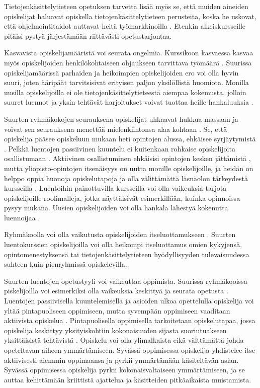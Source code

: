 \documentclass[finnish]{tktltiki2}
\theoremstyle{definition}
\theoremstyle{remark}
\begin{document}
Tietojenkäsittelytieteen opetuksen tarvetta lisää myös se, että muiden aineiden opiskelijat haluavat opiskella tietojenkäsittelytieteen perusteita, koska he uskovat, että ohjelmointitaidot auttavat heitä työmarkkinoilla \cite{Roberts11}. Etenkin alkeiskursseille pitäisi pystyä järjestämään riittävästi opetustarjontaa. \par

Kasvavista opiskelijamääristä voi seurata ongelmia. Kurssikoon kasvaessa kasvaa myös opiskelijoiden henkilökohtaiseen ohjaukseen tarvittava työmäärä \cite{Kay98}. Suurissa opiskelijamäärissä parhaiden ja heikoimpien opiskelijoiden ero voi olla hyvin suuri, joten ääripäät tarvitsisivat erityisen paljon yksilöllistä huomiota. Monilla uusilla opiskelijoilla ei ole tietojenkäsittelytieteestä aiempaa kokemusta, jolloin suuret luennot ja yksin tehtävät harjoitukset voivat tuottaa heille hankaluuksia \cite{Murphy11}. \par

Suurten ryhmäkokojen seurauksena opiskelijat uhkaavat hukkua massaan ja voivat sen seurauksena menettää mielenkiintonsa alaa kohtaan \cite{Kay98}. Se, että opiskelija pääsee opiskeluun mukaan heti opintojen alussa, ehkäisee syrjäytymistä \cite{Settle12}. Pelkkä luentojen passiivinen kuuntelu ei kuitenkaan rohkaise opiskelijoita osallistumaan \cite{Kopp00}. Aktiivinen osallistuminen ehkäisisi opintojen kesken jättämistä \cite{Boyer07}, mutta yliopisto-opintojen itsenäisyys on uutta monille opiskelijoille, ja heidän on helppo oppia huonoja opiskelutapoja ja olla välittämättä läsnäolon tärkeydestä kursseilla \cite{Kopp00}. Luentoihin painottuvilla kursseilla voi olla vaikeuksia tarjota opiskelijoille roolimalleja, jotka näyttäisivät esimerkillään, kuinka opinnoissa pysyy mukana. Uusien opiskelijoiden voi olla hankala lähestyä kokenutta luennoijaa \cite{Kopp00}. \par

Ryhmäkoolla voi olla vaikutusta opiskelijoiden itseluottamukseen \cite{Boyer07}. Suurten luentokurssien opiskelijoilla voi olla heikompi itseluottamus omien kykyjensä, opintomenestyksensä tai tietojenkäsittelytieteen hyödyllisyyden tulevaisuudessa suhteen kuin pienryhmissä opiskelevilla. \par

Suurten luentojen opetustyyli voi vaikeuttaa oppimista. Suurissa ryhmäkooissa piskelijoilla voi esimerkiksi olla vaikeuksia keskittyä ja seurata opetusta \cite{Boyer07}. Luentojen passiivisella kuuntelemisella ja asioiden ulkoa opettelulla opiskelija voi yltää pintapuoliseen oppimiseen, mutta syvempään oppimiseen vaaditaan aktiivista opiskelua \cite{Boyer07}. Pintapuolisella oppimisella tarkoitetaan opiskelutapaa, jossa opiskelija keskittyy yksityiskohtiin kokonaisuuden sijasta suoriutuakseen yksittäisistä tehtävistä \cite{DeepSurfaceLearning}. Opiskelu voi olla ylimalkaista eikä välttämättä johda opeteltavan aiheen ymmärtämiseen. Syvässä oppimisessa opiskelija yhdistelee itse aktiivisesti aiemmin oppimaansa ja pyrkii ymmärtämään käsiteltävän asian. Syvässä oppimisessa opiskelija pyrkii kokonaisvaltaiseen ymmärtämiseen, ja se auttaa kehittämään kriittistä ajattelua ja käsitteiden pitkäaikaista muistamista. \par
\end{document}
